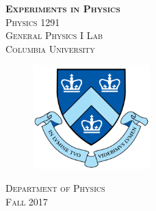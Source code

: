 \begin{titlepage}
\begin{center}
\textsc{\Huge\bf Experiments in Physics}
\\[5cm]
\textsc{\huge Physics 1291}
\\[0.3cm]
\textsc{\huge General Physics I Lab}
\\[4cm]
\textsc{\large Columbia University}
\\[0.5cm]
\begin{figure}[h]
  \centerings
  \includegraphics[height=4cm]{./pic/Columbia-Logo.png}
\end{figure}
\textsc{Department of Physics}
\\[1cm]
\textsc{Fall 2017}
\end{center}
\end{titlepage}
